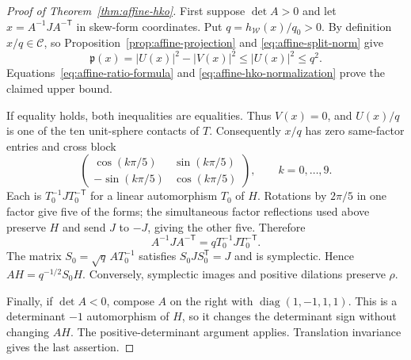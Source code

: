 \begin{proof}[Proof of Theorem~\ref{thm:affine-hko}]
First suppose $\det A>0$ and let
$x=A^{-1}JA^{-\mathsf T}$ in skew-form coordinates. Put
$q=h_{\mathcal W}(x)/q_0>0$. By definition $x/q\in\mathcal C$, so
Proposition~\ref{prop:affine-projection} and
\eqref{eq:affine-split-norm} give
\[
 \mathfrak p(x)=|U(x)|^2-|V(x)|^2\leq |U(x)|^2\leq q^2.
\]
Equations~\eqref{eq:affine-ratio-formula} and
\eqref{eq:affine-hko-normalization} prove the claimed upper bound.

If equality holds, both inequalities are equalities. Thus $V(x)=0$, and
$U(x)/q$ is one of the ten unit-sphere contacts of $T$. Consequently
$x/q$ has zero same-factor entries and cross block
\begin{equation}
 \begin{pmatrix}
 \cos(k\pi/5)&\sin(k\pi/5)\\
 -\sin(k\pi/5)&\cos(k\pi/5)
 \end{pmatrix},\qquad k=0,\ldots,9.
 \label{eq:affine-equality-forms}
\end{equation}
Each is $T_0^{-1}JT_0^{-\mathsf T}$ for a linear automorphism $T_0$ of
$H$. Rotations by $2\pi/5$ in one factor give five of the forms; the
simultaneous factor reflections used above preserve $H$ and send $J$ to
$-J$, giving the other five. Therefore
\[
 A^{-1}JA^{-\mathsf T}=qT_0^{-1}JT_0^{-\mathsf T}.
\]
The matrix $S_0=\sqrt q\,AT_0^{-1}$ satisfies $S_0JS_0^{\mathsf T}=J$
and is symplectic. Hence $AH=q^{-1/2}S_0H$.
Conversely, symplectic images and positive dilations preserve $\rho$.

Finally, if $\det A<0$, compose $A$ on the right with
$\operatorname{diag}(1,-1,1,1)$. This is a determinant
$-1$ automorphism of $H$, so it changes the determinant sign without
changing $AH$. The positive-determinant argument applies. Translation
invariance gives the last assertion.
\end{proof}
